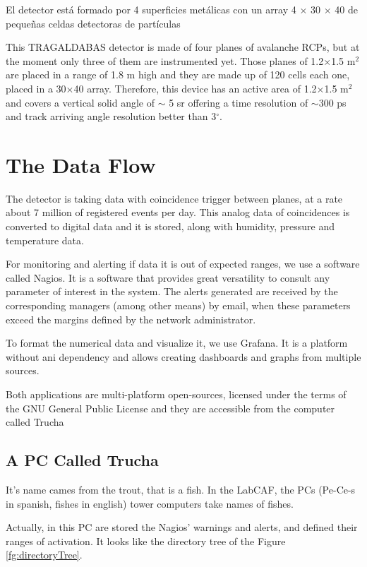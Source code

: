 \documentclass{book}
\begin{document}
El detector está formado por 4 superficies metálicas con un array 4 $\times$ 30 $\times$ 40 de pequeñas celdas detectoras de partículas

This TRAGALDABAS detector is made of four planes of avalanche RCPs, but at the moment only three of them are instrumented yet. Those planes of 1.2$\times$1.5 m$^2$ are placed in a range of 1.8 m high and they are made up of 120 cells each one, placed in a 30$\times$40 array. Therefore, this device has an active area of 1.2$\times$1.5 m$^2$ and covers a vertical solid angle of $\sim $ 5 sr offering a time resolution of $\sim 300$ ps and track arriving angle resolution better than 3$^\circ$. 

\section{The Data Flow}

The detector is taking data with coincidence trigger between planes, at a rate about 7 million of registered events per day. This analog data of coincidences is converted to digital data and it is stored, along with humidity, pressure and temperature data.

For monitoring and alerting if data it is out of expected ranges, we use a software called Nagios. It is a software that provides great versatility to consult any parameter of interest in the system. The alerts generated are received by the corresponding managers (among other means) by email, when these parameters exceed the margins defined by the network administrator.

To format the numerical data and visualize it, we use Grafana. It is a platform without ani dependency and allows creating dashboards and graphs from multiple sources.

Both applications are multi-platform open-sources, licensed under the terms of the GNU General Public License and they are accessible from the computer called Trucha

\subsection{A PC Called Trucha}

It's name cames from the trout, that is a fish. In the LabCAF, the PCs (Pe-Ce-s in spanish, fishes in english) tower computers take names of fishes.

Actually, in this PC are stored the Nagios' warnings and alerts, and defined their ranges of activation. It looks like the directory tree of the Figure \ref{fg:directoryTree}.
\end{document}
